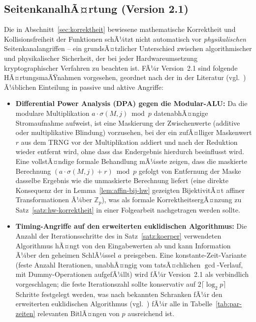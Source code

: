 ﻿\documentclass[a4paper,12pt]{article}
\theoremstyle{definition}
\begin{document}
\subsection{SeitenkanalhÃ¤rtung (Version 2.1)}

Die in Abschnitt~\ref{sec:korrektheit} bewiesene mathematische Korrektheit und Kollisionsfreiheit der Funktionen schÃ¼tzt nicht automatisch vor \emph{physikalischen} Seitenkanalangriffen -- ein grundsÃ¤tzlicher Unterschied zwischen algorithmischer und physikalischer Sicherheit, der bei jeder Hardwareumsetzung kryptographischer Verfahren zu beachten ist. FÃ¼r Version~2.1 sind folgende HÃ¤rtungsmaÃŸnahmen vorgesehen, geordnet nach der in der Literatur (vgl.\ \cite{KL15}) Ã¼blichen Einteilung in passive und aktive Angriffe:

\begin{itemize}
	\item \textbf{Differential Power Analysis (DPA) gegen die Modular-ALU:} Da die modulare Multiplikation $a \cdot \sigma(M,j) \bmod p$ datenabhÃ¤ngige Stromaufnahme aufweist, ist eine Maskierung der Zwischenwerte (additive oder multiplikative Blindung) vorzusehen, bei der ein zufÃ¤lliger Maskenwert $r$ aus dem TRNG vor der Multiplikation addiert und nach der Reduktion wieder entfernt wird, ohne dass das Endergebnis hierdurch beeinflusst wird. Eine vollstÃ¤ndige formale Behandlung mÃ¼sste zeigen, dass die maskierte Berechnung $(a \cdot \sigma(M,j) + r) \bmod p$ gefolgt von Entfernung der Maske dasselbe Ergebnis wie die unmaskierte Berechnung liefert (eine direkte Konsequenz der in Lemma~\ref{lem:affin-bij-hw} gezeigten BijektivitÃ¤t affiner Transformationen Ã¼ber $\mathbb{Z}_p$), was als formale KorrektheitsergÃ¤nzung zu Satz~\ref{satz:hw-korrektheit} in einer Folgearbeit nachgetragen werden sollte.
	\item \textbf{Timing-Angriffe auf den erweiterten euklidischen Algorithmus:} Die Anzahl der Iterationsschritte des in Satz~\ref{satz:koerper} verwendeten Algorithmus hÃ¤ngt von den Eingabewerten ab und kann Information Ã¼ber den geheimen SchlÃ¼ssel $a$ preisgeben. Eine konstante-Zeit-Variante (feste Anzahl Iterationen, unabhÃ¤ngig vom tatsÃ¤chlichen $\gcd$-Verlauf, mit Dummy-Operationen aufgefÃ¼llt) wird fÃ¼r Version~2.1 als verbindlich vorgeschlagen; die feste Iterationszahl sollte konservativ auf $2\lceil\log_2 p\rceil$ Schritte festgelegt werden, was nach bekannten Schranken fÃ¼r den erweiterten euklidischen Algorithmus (vgl.\ \cite{Buc16}) fÃ¼r alle in Tabelle~\ref{tab:par-zeiten} relevanten BitlÃ¤ngen von $p$ ausreichend ist.

\end{itemize}
\end{document}
